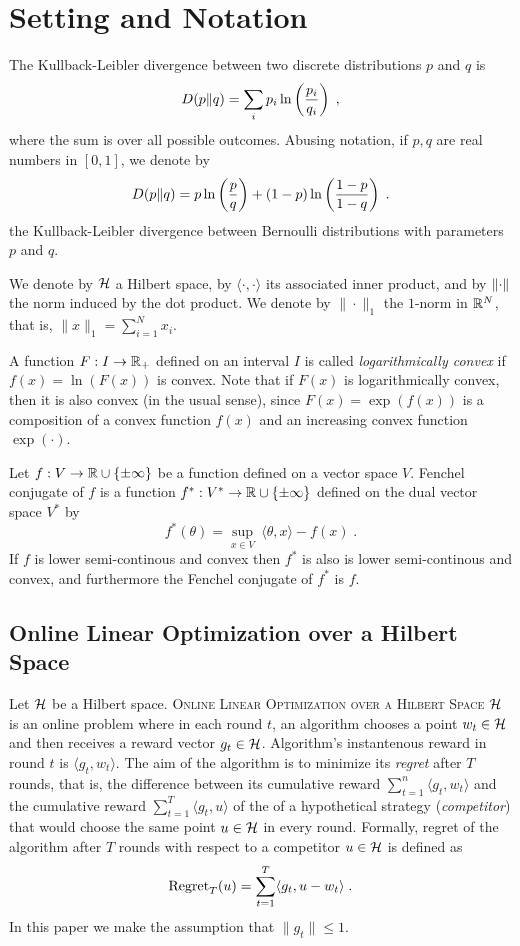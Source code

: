 \section{Setting and Notation}

The Kullback-Leibler divergence between two discrete
distributions $p$ and $q$ is
$$
D({p}\|{q}) = \sum_{i} p_i \ln\left( \frac{p_i}{q_i} \right) \; ,
$$
where the sum is over all possible outcomes. Abusing notation, if $p,q$ are real
numbers in $[0,1]$, we denote by
$$
D({p}\|{q}) = p \ln \left(\frac{p}{q} \right) + (1-p) \ln \left(\frac{1-p}{1-q} \right) \; .
$$
the Kullback-Leibler divergence between Bernoulli distributions with parameters
$p$ and $q$.

We denote by $\mathcal{H}$ a Hilbert space, by $\langle \cdot, \cdot\rangle$ its
associated inner product, and by $\left\|{\cdot}\right\|$ the norm induced by the dot
product. We denote by $\|\cdot\|_1$ the $1$-norm in $\mathbb{R}^N$, that is, $\|x\|_1 =
\sum_{i=1}^N x_i$.

A function $F:I \to \mathbb{R}_+$ defined on an interval $I$ is called
\emph{logarithmically convex} if $f(x) = \ln(F(x))$ is convex. Note that if
$F(x)$ is logarithmically convex, then it is also convex (in the usual sense),
since $F(x) = \exp(f(x))$ is a composition of a convex function $f(x)$ and an
increasing convex function $\exp(\cdot)$.

Let $f:V \to \mathbb{R} \cup \{\pm\infty\}$ be a function defined on a vector space $V$.
Fenchel conjugate of $f$ is a function $f^*:V^* \to \mathbb{R} \cup \{\pm \infty\}$
defined on the dual vector space $V^*$ by
$$
f^*(\theta) = \sup_{x \in V} \ \langle \theta, x \rangle - f(x) \; .
$$
If $f$ is lower semi-continous and convex then $f^*$ is also is lower
semi-continous and convex, and furthermore the Fenchel conjugate of $f^*$ is
$f$.

\subsection{Online Linear Optimization over a Hilbert Space}

Let $\mathcal{H}$ be a Hilbert space. \textsc{Online Linear Optimization over a Hilbert
Space $\mathcal{H}$} is an online problem where in each round $t$, an algorithm chooses a
point $w_t \in \mathcal{H}$ and then receives a reward vector $g_t \in \mathcal{H}$. Algorithm's
instantenous reward in round $t$ is $\langle g_t, w_t \rangle$. The aim of the
algorithm is to minimize its \emph{regret} after $T$ rounds, that is, the
difference between its cumulative reward $\sum_{t=1}^n \langle g_t, w_t \rangle$
and the cumulative reward $\sum_{t=1}^T \langle g_t, u \rangle$ of the of a
hypothetical strategy (\emph{competitor}) that would choose the same point $u
\in \mathcal{H}$ in every round. Formally, regret of the algorithm after $T$ rounds with
respect to a competitor $u \in \mathcal{H}$ is defined as
\begin{equation}
\label{equation:regret-definition}
\operatorname{Regret}_T(u) = \sum_{t=1}^T \langle g_t , u - w_t \rangle \; .
\end{equation}
In this paper we make the assumption that $\|g_t\| \le 1$.


